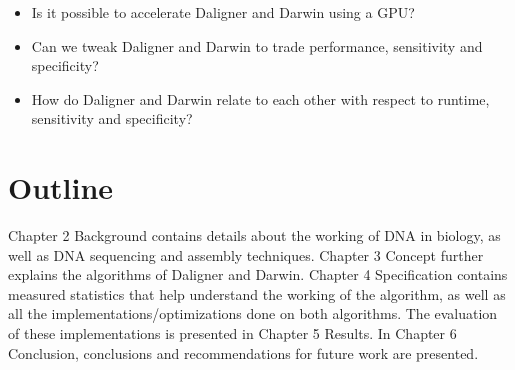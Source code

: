 \documentclass[../thesis.tex]{subfiles}
\begin{document}
\begin{itemize}
\item Is it possible to accelerate Daligner and Darwin using a GPU?
\item Can we tweak Daligner and Darwin to trade performance, sensitivity and specificity?
\item How do Daligner and Darwin relate to each other with respect to runtime, sensitivity and specificity?
\end{itemize}

\newpage

\section{Outline}
Chapter 2 Background contains details about the working of DNA in biology, as well as DNA sequencing and assembly techniques.
Chapter 3 Concept further explains the algorithms of Daligner and Darwin.
Chapter 4 Specification contains measured statistics that help understand the working of the algorithm, as well as all the implementations/optimizations done on both algorithms.
The evaluation of these implementations is presented in Chapter 5 Results.
In Chapter 6 Conclusion, conclusions and recommendations for future work are presented.



\end{document}
